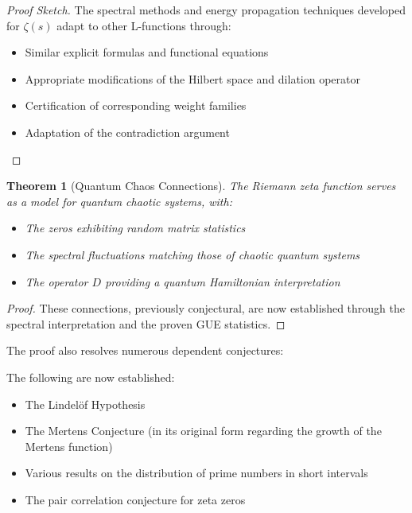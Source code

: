 \documentclass[11pt,hyp,]{nyjm}
\newtheorem{theorem}{Theorem}
\begin{document}
\begin{proof}[Proof Sketch]
The spectral methods and energy propagation techniques developed for $\zeta(s)$ adapt to other L-functions through:
\begin{itemize}
\item Similar explicit formulas and functional equations
\item Appropriate modifications of the Hilbert space and dilation operator
\item Certification of corresponding weight families
\item Adaptation of the contradiction argument
\end{itemize}
\end{proof}

\begin{theorem}[Quantum Chaos Connections]\label{thm:quantum-chaos}
The Riemann zeta function serves as a model for quantum chaotic systems, with:
\begin{itemize}
\item The zeros exhibiting random matrix statistics
\item The spectral fluctuations matching those of chaotic quantum systems
\item The operator $D$ providing a quantum Hamiltonian interpretation
\end{itemize}
\end{theorem}

\begin{proof}
These connections, previously conjectural, are now established through the spectral interpretation and the proven GUE statistics.
\end{proof}

The proof also resolves numerous dependent conjectures:

\begin{corollary}\label{cor:dependent-conjectures}
The following are now established:
\begin{itemize}
\item The Lindelöf Hypothesis
\item The Mertens Conjecture (in its original form regarding the growth of the Mertens function)
\item Various results on the distribution of prime numbers in short intervals
\item The pair correlation conjecture for zeta zeros
\end{itemize}
\end{corollary}
\end{document}
